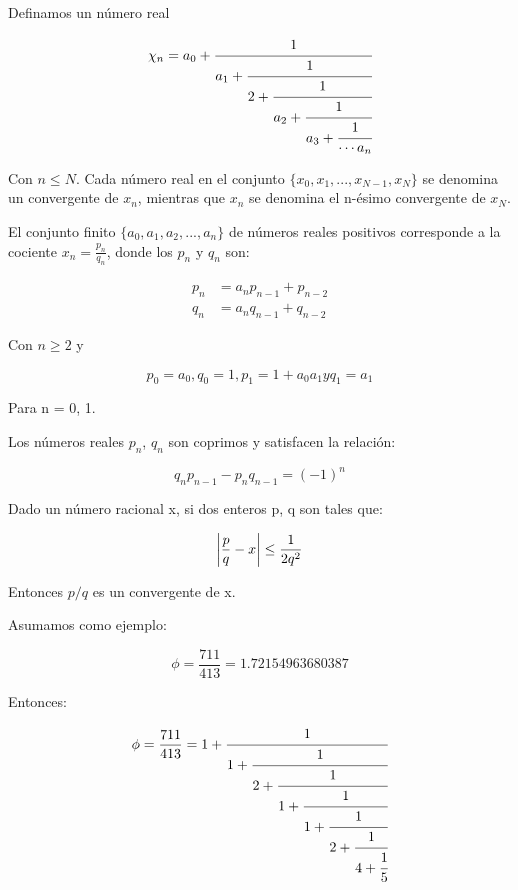 Definamos un número real

\begin{equation}
    \chi_n=a_0+\cfrac{1}{a_1 + \cfrac{1}{2+\cfrac{1}{a_2 + \cfrac{1}{a_3 + \cfrac{1}{\cdots a_n}}}}}
\end{equation}

Con $n \leq N$. Cada número real en el conjunto $\{x_0,x_1,...,x_{N-1},x_N\}$ se denomina un convergente de $x_n$, mientras que $x_n$ se denomina el n-ésimo convergente de $x_N$.

El conjunto finito $\{a_0,a_1,a_2,...,a_n\}$ de números reales positivos corresponde a la cociente $x_n = \frac{p_n}{q_n}$, donde los $p_n$ y $q_n$ son:

\begin{align}
    p_n &= a_n p_{n-1} + p_{n-2} \\
    q_n &= a_n q_{n-1} + q_{n-2}
\end{align}

Con $n \geq 2$ y

\begin{equation}
    p_0 = a_0, q_0 = 1, p_1 = 1 + a_0 a_1 y q_1 = a_1
\end{equation}

Para n = 0, 1.

Los números reales $p_n$, $q_n$ son coprimos y satisfacen la relación:

\begin{equation}
    q_n p_{n-1} - p_n q_{n-1} = (-1)^n
\end{equation}

Dado un número racional x, si dos enteros p, q son tales que:

\begin{equation}
    \abs{\frac{p}{q} - x} \leq \frac{1}{2q^2}
\end{equation}

Entonces $p/q$ es un convergente de x.

Asumamos como ejemplo:

\begin{equation}
    \phi = \frac{711}{413} = 1.72154963680387
\end{equation}

Entonces:

\begin{equation}
    \phi = \frac{711}{413} = 1 + \cfrac{1}{1 + \cfrac{1}{2 + \cfrac{1}{1 + \cfrac{1}{1 + \cfrac{1}{2 + \cfrac{1}{4 + \cfrac{1}{5}}}}}}}
\end{equation}

